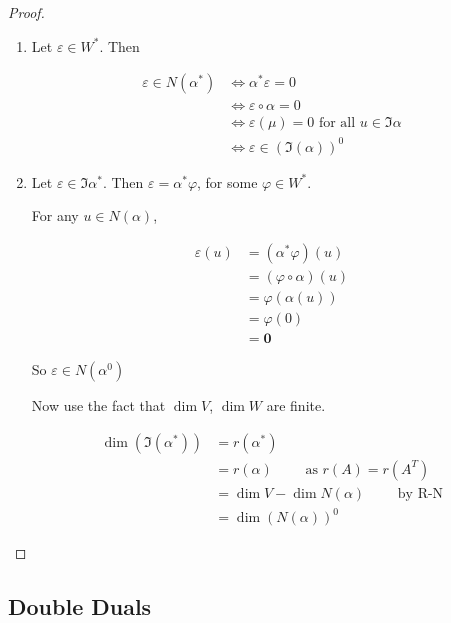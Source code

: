 \documentclass[a4paper]{article}
\begin{document}
\begin{proof}
	\begin{enumerate}
		\item Let $ \varepsilon \in W^{*} $. Then 
		
		
		
		\begin{align*}
		\varepsilon \in N(\alpha^{*}) & \iff \alpha^{*} \varepsilon = 0 \\
		& \iff \varepsilon \circ \alpha = 0  \\
		& \iff \varepsilon(\mu) = 0 \text{ for all } u \in \Im \alpha\\
		&  \iff \varepsilon \in \left(  \Im(\alpha) \right)^{0}
		\end{align*}
		
		\item Let $ \varepsilon \in \Im \alpha^{*} $. Then $ \varepsilon = \alpha^{*} \varphi $, for some $ \varphi \in W^{*} $.
		
		For any $ u \in N(\alpha) $,
		
		\begin{align*}
		\varepsilon(u) & = (\alpha^{*}  \varphi )(u) \\
		& = (\varphi \circ \alpha) (u)\\
		& = \varphi(\alpha(u)) \\
		& = \varphi(0) \\
		& = \mathbf{0}
		\end{align*}
		
		So $ \varepsilon \in N(\alpha^{0}) $
		
		
		Now use the fact that $ \dim V $, $ \dim W $ are finite. 
		
		
		\begin{align*}
		\dim (\Im(\alpha^{*})) & = r(\alpha^{*}) \\
		& = r(\alpha) \qquad \text{ as } r(A) = r(A^{T})  \\
		& =  \dim V - \dim N(\alpha) \qquad \text{ by R-N} \\
		& = \dim (N(\alpha))^{0}
		\end{align*}
		
	\end{enumerate}

\end{proof}


\subsection{Double Duals}
\end{document}
